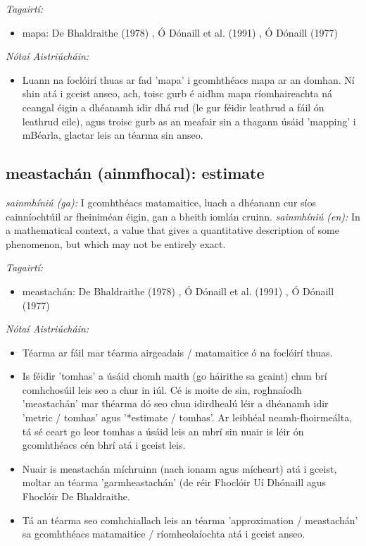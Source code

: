 \documentclass{article}
\begin{document}
 \noindent \textit{Tagairtí:}
\begin{itemize}
	\item mapa: De Bhaldraithe (1978) \cite{de-bhaldraithe}, Ó Dónaill et al. (1991) \cite{focloir-beag}, Ó Dónaill (1977) \cite{odonaill}
\end{itemize}

 \noindent \textit{Nótaí Aistriúcháin:}
\begin{itemize}
	\item Luann na foclóirí thuas ar fad 'mapa' i gcomhthéacs mapa ar an domhan. Ní shin atá i gceist anseo, ach, toisc gurb é aidhm mapa ríomhaireachta ná ceangal éigin a dhéanamh idir dhá rud (le gur féidir leathrud a fáil ón leathrud eile), agus troisc gurb as an meafair sin a thagann úsáid 'mapping' i mBéarla, glactar leis an téarma sin anseo.
\end{itemize}


\subsection*{meastachán (ainmfhocal): estimate} 
 \noindent \textit{sainmhíniú (ga):} I gcomhthéacs matamaitice, luach a dhéanann cur síos cainníochtúil ar fheiniméan éigin, gan a bheith iomlán cruinn.
\newline\newline
 \noindent \textit{sainmhíniú (en):} In a mathematical context, a value that gives a quantitative description of some phenomenon, but which may not be entirely exact.
\newline

 \noindent \textit{Tagairtí:}
\begin{itemize}
	\item meastachán: De Bhaldraithe (1978) \cite{de-bhaldraithe}, Ó Dónaill et al. (1991) \cite{focloir-beag}, Ó Dónaill (1977) \cite{odonaill}
\end{itemize}

 \noindent \textit{Nótaí Aistriúcháin:}
\begin{itemize}
	\item Téarma ar fáil mar téarma airgeadais / matamaitice ó na foclóirí thuas.
	\item Is féidir 'tomhas' a úsáid chomh maith (go háirithe sa gcaint) chun brí comhchosúil leis seo a chur in iúl. Cé is moite de sin, roghnaíodh 'meastachán' mar théarma dó seo chun idirdhealú léir a dhéanamh idir 'metric / tomhas' agus '*estimate / tomhas'. Ar leibhéal neamh-fhoirmeálta, tá sé ceart go leor tomhas a úsáid leis an mbrí sin nuair is léir ón gcomhthéacs cén bhrí atá i gceist leis.
	\item Nuair is meastachán míchruinn (nach ionann agus mícheart) atá i gceist, moltar an téarma 'garmheastachán' (de réir Fhoclóir Uí Dhónaill agus Fhoclóir De  Bhaldraithe.
	\item Tá an téarma seo comhchiallach leis an téarma 'approximation / meastachán' sa gcomhthéacs matamaitice / ríomheolaíochta atá i gceist anseo.
\end{itemize}
\end{document}
